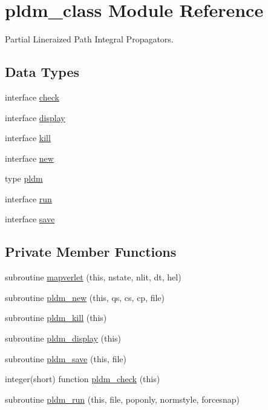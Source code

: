 \hypertarget{classpldm__class}{\section{pldm\+\_\+class Module Reference}
\label{classpldm__class}
}


Partial Lineraized Path Integral Propagators.  


\subsection*{Data Types}
\begin{DoxyCompactItemize}
\item 
interface \hyperlink{interfacepldm__class_1_1check}{check}
\item 
interface \hyperlink{interfacepldm__class_1_1display}{display}
\item 
interface \hyperlink{interfacepldm__class_1_1kill}{kill}
\item 
interface \hyperlink{interfacepldm__class_1_1new}{new}
\item 
type \hyperlink{structpldm__class_1_1pldm}{pldm}
\item 
interface \hyperlink{interfacepldm__class_1_1run}{run}
\item 
interface \hyperlink{interfacepldm__class_1_1save}{save}
\end{DoxyCompactItemize}
\subsection*{Private Member Functions}
\begin{DoxyCompactItemize}
\item 
subroutine \hyperlink{classpldm__class_a56bc2a02f61ba7f0ef59c429a9f1e038}{mapverlet} (this, nstate, nlit, dt, hel)
\item 
subroutine \hyperlink{classpldm__class_a12da2274f89c7978903a0e5de4c0a2a7}{pldm\+\_\+new} (this, qs, cs, cp, file)
\item 
subroutine \hyperlink{classpldm__class_ae3cf3688fae95f3ab1729475a8fde0fd}{pldm\+\_\+kill} (this)
\item 
subroutine \hyperlink{classpldm__class_a0b7b20ee63a6203b24c700190738338b}{pldm\+\_\+display} (this)
\item 
subroutine \hyperlink{classpldm__class_aa71a81cb75e284923b6a6f8e4085c564}{pldm\+\_\+save} (this, file)
\item 
integer(short) function \hyperlink{classpldm__class_a87937cd139205ea96672b513c5124b8f}{pldm\+\_\+check} (this)
\item 
subroutine \hyperlink{classpldm__class_acb662f59407b2a0bd62fc36aab876482}{pldm\+\_\+run} (this, file, poponly, normstyle, forcesnap)
\end{DoxyCompactItemize}
